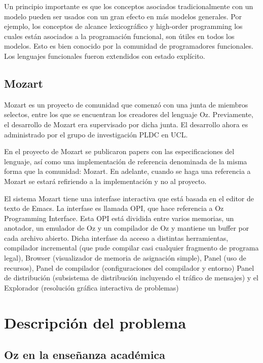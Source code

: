 \documentclass[a4paper,11pt]{article}
\begin{document}
Un principio importante es que los conceptos asociados tradicionalmente con un modelo pueden ser usados con un gran efecto en más modelos generales. Por ejemplo, los conceptos de alcance lexicográfico y high-order programming los cuales están asociados a la programación funcional, son útiles en todos los modelos. Esto es bien conocido por la comunidad de programadores funcionales. Los lenguajes funcionales fueron extendidos con estado explícito.


\subsection{Mozart}

Mozart es un proyecto de comunidad que comenzó con una junta de miembros selectos, entre los que se encuentran los creadores del lenguaje Oz. Previamente, el desarrollo de Mozart era supervisado por dicha junta. El desarrollo ahora es administrado por el grupo de investigación PLDC en UCL.

En el proyecto de Mozart se publicaron papers con las especificaciones del lenguaje, así como una implementación de referencia denominada de la misma forma que la comunidad: Mozart. En adelante, cuando se haga una referencia a Mozart se estará refiriendo a la implementación y no al proyecto.

El sistema Mozart tiene una interfase interactiva que está basada en el editor de texto de Emacs. La interfase es llamada OPI, que hace referencia a Oz Programming Interface. Esta OPI está dividida entre varios memorias, un anotador, un emulador de Oz y un compilador de Oz y mantiene un buffer por cada archivo abierto. Dicha interfase da acceso a distintas herramientas, compilador incremental (que pude compilar casi cualquier fragmento de programa legal), Browser (visualizador de memoria de asignación simple), Panel (uso de recursos), Panel de compilador (configuraciones del compilador y entorno) Panel de distribución (subsistema de distribución incluyendo el tráfico de mensajes) y el Explorador (resolución gráfica interactiva de problemas)

\section{Descripción del problema}

\subsection{Oz en la enseñanza académica}
\end{document}
